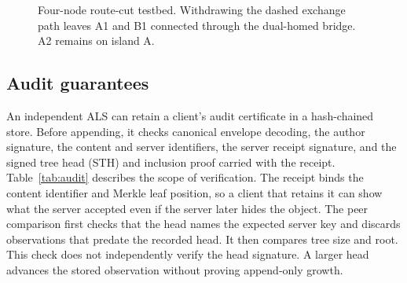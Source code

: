 \documentclass[conference,a4paper,10pt]{IEEEtran}
\begin{document}
\begin{figure}[!t]
  \centering
  \caption{Four-node route-cut testbed. Withdrawing the dashed exchange path leaves A1 and B1 connected through the dual-homed bridge. A2 remains on island A.}
  \label{fig:topology}
\end{figure}

\subsection{Audit guarantees}

An independent ALS can retain a client's audit certificate in a hash-chained store. Before appending, it checks canonical envelope decoding, the author signature, the content and server identifiers, the server receipt signature, and the signed tree head (STH) and inclusion proof carried with the receipt. Table~\ref{tab:audit} describes the scope of verification. The receipt binds the content identifier and Merkle leaf position, so a client that retains it can show what the server accepted even if the server later hides the object. The peer comparison first checks that the head names the expected server key and discards observations that predate the recorded head. It then compares tree size and root. This check does not independently verify the head signature. A larger head advances the stored observation without proving append-only growth.
\end{document}
